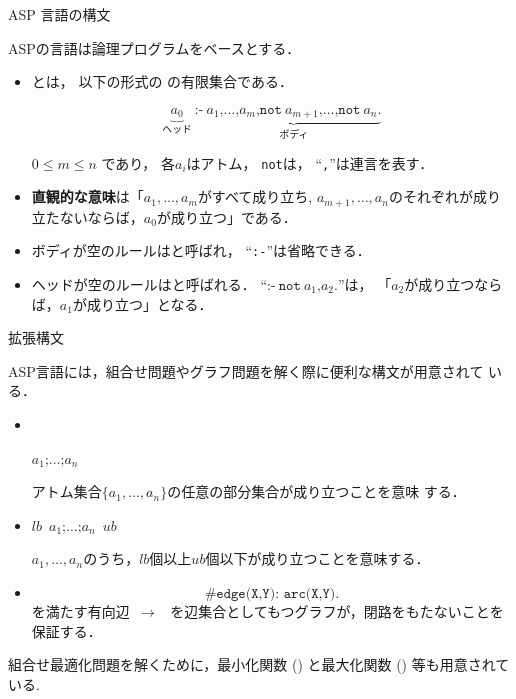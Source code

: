 \documentclass[dvipdfmx,10pt]{beamer}
\begin{document}
\begin{frame}{ASP 言語の構文}
\begin{alertblock}{}\centering
  ASPの言語は論理プログラムをベースとする\footnotemark．
\end{alertblock}

\begin{itemize}
  \item {}とは，
	以下の形式の
	の有限集合である．
\begin{block}{}
    \[
	\underbrace{a_0}_{\textrm{ヘッド}}\ \texttt{:-}\
	\underbrace{a_1\texttt{,}\dots\texttt{,}a_m\texttt{,}
	\texttt{not}\ {a_{m+1}}\texttt{,}\dots\texttt{,}
	\texttt{not}\ {a_n}\texttt{.}}_{\textrm{ボディ}}
    \]
\end{block}
    $0\leq m\leq n$ であり，
    各$a_i$はアトム，
    \texttt{not}は，
    ``\texttt{,}''は連言を表す．
    \pause
  \item \alert{\bf 直観的な意味}は「$a_1,\ldots,a_m$がすべて成り立ち,
    $a_{m+1},\ldots,a_n$のそれぞれが成り立たないならば，$a_0$が成り立つ」である．
    \pause
  \item ボディが空のルールはと呼ばれ，
	``\texttt{:-}''は省略できる．
  \item ヘッドが空のルールはと呼ばれる．
	``\(\texttt{:-}\ \texttt{not}\ a_1\texttt{,} {a_{2}}\texttt{.}\)''は，
	「$a_2$が成り立つならば，$a_1$が成り立つ」となる．
\end{itemize}
\end{frame}
\begin{frame}{拡張構文}
\begin{alertblock}{}\centering
 ASP言語には，組合せ問題やグラフ問題を解く際に便利な構文が用意されて
 いる．
\end{alertblock}

\begin{itemize}
\item {}\\
  \begin{center}
   \code{\{}\(a_1\texttt{;}\dots\texttt{;}a_n\)\code{\}}\\
  \end{center}
  アトム集合\(\{a_1,\dots,a_n\}\)の任意の部分集合が成り立つことを意味
  する．
\item {}
  \begin{center}
   $lb$\ \code{\{}\(a_1\texttt{;}\dots\texttt{;}a_n\)\code{\}}\ $ub$
  \end{center}
  $a_1,\dots,a_n$のうち，$lb$個以上$ub$個以下が成り立つことを意味する．
\item {}
  \[
      \texttt{\#edge(X,Y): 
      arc(X,Y)}.
  \]
  を満たす有向辺~$\rightarrow$~
  を辺集合としてもつグラフが，閉路をもたないことを保証する．
\end{itemize}
\vfill
\pause
組合せ最適化問題を解くために，最小化関数 () 
と最大化関数 () 等も用意されている.
\end{frame}
\end{document}
